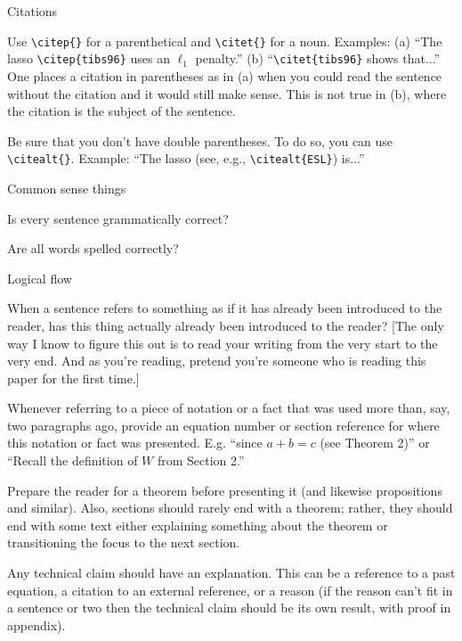 \documentclass[11pt]{article}
\begin{document}
\begin{todolist}
\begin{todolist}
  \end{todolist}
\item Citations
  \begin{todolist}
\item Use \verb+\citep{}+ for a parenthetical and \verb+\citet{}+ for a noun.
    Examples: (a) ``The lasso \verb+\citep{tibs96}+ uses an $\ell_1$ penalty.'' (b)
    ``\verb+\citet{tibs96}+ shows that...''  One places a citation in
    parentheses as in (a) when you could read the sentence without the
    citation and it would still make sense.  This is not true in (b),
    where the citation is the subject of the sentence.
\item Be sure that you don't have double parentheses.  To do so, you can use
    \verb+\citealt{}+.  Example: ``The lasso (see, e.g., \verb+\citealt{ESL}+) is...''
  \end{todolist}
\item Common sense things
  \begin{todolist}
\item Is every sentence grammatically correct?
\item Are all words spelled correctly?
  \end{todolist}
\item Logical flow
  \begin{todolist}
    \item When a sentence refers to something as if it has already been introduced to the reader, has this thing actually already been introduced to the reader? [The only way I know to figure this out is to read your writing from the very start to the very end.  And as you're reading, pretend you're someone who is reading this paper for the first time.]
\item Whenever referring to a piece of notation or a fact that was used more than, say, two paragraphs ago, provide an equation number or section reference for where this notation or fact was presented.  E.g. ``since $a+b=c$ (see Theorem 2)'' or ``Recall the definition of $W$ from Section 2.''
\item Prepare the reader for a theorem before presenting it (and likewise propositions and similar).  Also, sections should rarely end with a theorem; rather, they should end with some text either explaining something about the theorem or transitioning the focus to the next section.
\item Any technical claim should have an explanation.  This can be a reference to a past equation, a citation to an external reference, or a reason (if the reason can't fit in a sentence or two then the technical claim should be its own result, with proof in appendix).

\end{todolist}
\end{todolist}
\end{document}
